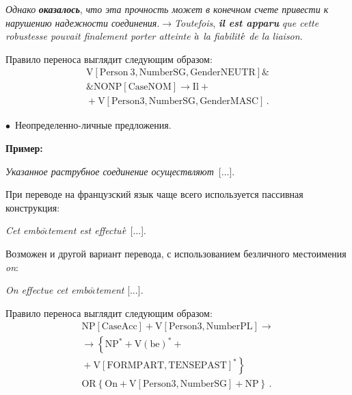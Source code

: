 \begin{multicols}{2}
     \textit{Однако} {\bfseries\textit{оказалось}}, \textit{что эта прочность 
может в конечном счете привести к нарушению надежности 
соединения}.\;$\rightarrow$\;\textit{Toutefois}, {\bfseries\textit{il est apparu}} 
\textit{que cette robustesse pouvait finalement porter atteinte}  
$\grave{\mbox{\textit{a}}}$ \textit{la fiabilit}$\acute{\mbox{\textit{e}}}$ \textit{de 
la liaison}.
{

}
     
     Правило переноса выглядит следующим образом:
     \begin{multline*}
     \mathrm{V[Person~3, Number SG, Gender NEUTR]} \&{}\\
     {}\&  \mathrm{NO  NP[Case NOM]} \rightarrow \mathrm{Il} +{}\\
     {}+\mathrm{ V[Person 3, Number SG, Gender  MASC]}\,.
     \end{multline*}

$\bullet$~Неопределенно-личные предложения.

\medskip

\noindent
\textbf{Пример:}
     
\begin{center}
     \textit{Указанное раструбное соединение осуществляют}~[$\ldots$]. 
     \end{center}
     
     При переводе на французский язык чаще всего используется пассивная 
конструкция:

\begin{center}
          \textit{Cet embo}$\hat{\iota}$\textit{tement est 
effectu}$\acute{\mbox{\textit{e}}}$ [$\ldots$].
\end{center}
     
     Возможен и другой вариант перевода, с использованием безличного 
местоимения \textit{on}:
     
\begin{center}
     \textit{On effectue cet embo}$\hat{\iota}$\textit{tement} [$\ldots$].
     \end{center}
     
     Правило переноса выглядит следующим образом:
     \begin{multline*}
     \mathrm{NP[Case Acc] + V[Person 3, Number PL]}\rightarrow {}\\
     {}\rightarrow  \left \{\mathrm{NP^* + V(be)^*} +{}\right.\\
\left.{}+ \mathrm{V[FORM PART, TENSE PAST]^*}\right\} \\
\mathrm{OR} \left\{\mathrm{On + V[Person 3, Number SG] + NP}\right\}\,.
\end{multline*}
     

\end{multicols}
